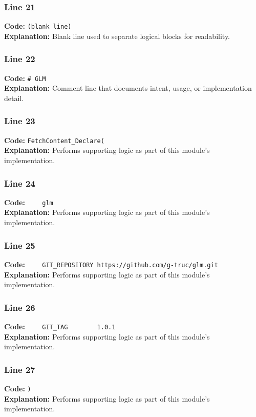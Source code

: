 \documentclass[11pt,a4paper]{article}
\begin{document}
\subsubsection*{Line 21}
\textbf{Code:} \texttt{(blank line)}\\
\textbf{Explanation:} Blank line used to separate logical blocks for readability.

\subsubsection*{Line 22}
\textbf{Code:} \verb|# GLM|\\
\textbf{Explanation:} Comment line that documents intent, usage, or implementation detail.

\subsubsection*{Line 23}
\textbf{Code:} \verb|FetchContent_Declare(|\\
\textbf{Explanation:} Performs supporting logic as part of this module's implementation.

\subsubsection*{Line 24}
\textbf{Code:} \verb|    glm|\\
\textbf{Explanation:} Performs supporting logic as part of this module's implementation.

\subsubsection*{Line 25}
\textbf{Code:} \verb|    GIT_REPOSITORY https://github.com/g-truc/glm.git|\\
\textbf{Explanation:} Performs supporting logic as part of this module's implementation.

\subsubsection*{Line 26}
\textbf{Code:} \verb|    GIT_TAG        1.0.1|\\
\textbf{Explanation:} Performs supporting logic as part of this module's implementation.

\subsubsection*{Line 27}
\textbf{Code:} \verb|)|\\
\textbf{Explanation:} Performs supporting logic as part of this module's implementation.
\end{document}
